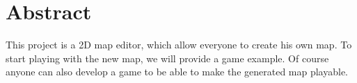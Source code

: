 \newpage
\thispagestyle{empty}

\chapter{Abstract}

This project is a 2D map editor, which allow everyone to create his own map. To start playing with the new map, we will provide a game example. Of course anyone can also develop a game to be able to make the generated map playable.